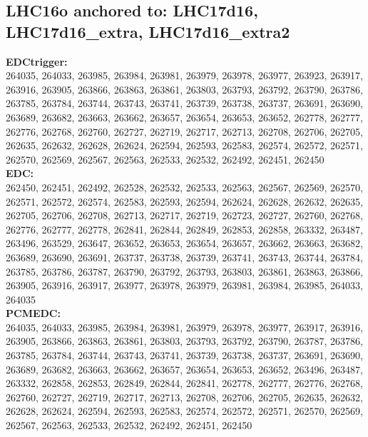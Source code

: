  \subsection{LHC16o anchored to: LHC17d16, LHC17d16\_extra, LHC17d16\_extra2}

 \textbf{EDCtrigger:}\\
264035, 264033, 263985, 263984, 263981, 263979, 263978, 263977, 263923, 263917, 263916, 263905, 263866, 263863, 263861, 263803, 263793, 263792, 263790, 263786, 263785, 263784, 263744, 263743, 263741, 263739, 263738, 263737, 263691, 263690, 263689, 263682, 263663, 263662, 263657, 263654, 263653, 263652, 262778, 262777, 262776, 262768, 262760, 262727, 262719, 262717, 262713, 262708, 262706, 262705, 262635, 262632, 262628, 262624, 262594, 262593, 262583, 262574, 262572, 262571, 262570, 262569, 262567, 262563, 262533, 262532, 262492, 262451, 262450\\

 \textbf{EDC:}\\
262450, 262451, 262492, 262528, 262532, 262533, 262563, 262567, 262569, 262570, 262571, 262572, 262574, 262583, 262593, 262594, 262624, 262628, 262632, 262635, 262705, 262706, 262708, 262713, 262717, 262719, 262723, 262727, 262760, 262768, 262776, 262777, 262778, 262841, 262844, 262849, 262853, 262858, 263332, 263487, 263496, 263529, 263647, 263652, 263653, 263654, 263657, 263662, 263663, 263682, 263689, 263690, 263691, 263737, 263738, 263739, 263741, 263743, 263744, 263784, 263785, 263786, 263787, 263790, 263792, 263793, 263803, 263861, 263863, 263866, 263905, 263916, 263917, 263977, 263978, 263979, 263981, 263984, 263985, 264033, 264035\\

 \textbf{PCMEDC:}\\
264035, 264033, 263985, 263984, 263981, 263979, 263978, 263977, 263917, 263916, 263905, 263866, 263863, 263861, 263803, 263793, 263792, 263790, 263787, 263786, 263785, 263784, 263744, 263743, 263741, 263739, 263738, 263737, 263691, 263690, 263689, 263682, 263663, 263662, 263657, 263654, 263653, 263652, 263496, 263487, 263332, 262858, 262853, 262849, 262844, 262841, 262778, 262777, 262776, 262768, 262760, 262727, 262719, 262717, 262713, 262708, 262706, 262705, 262635, 262632, 262628, 262624, 262594, 262593, 262583, 262574, 262572, 262571, 262570, 262569, 262567, 262563, 262533, 262532, 262492, 262451, 262450\\

